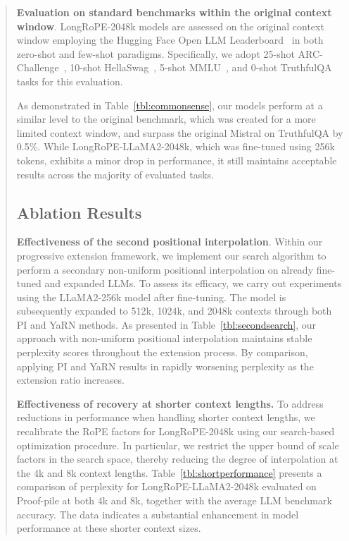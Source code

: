 \begin{abstract}
\textbf{Evaluation on standard benchmarks within the original context window}. LongRoPE-2048k models are assessed on the original context window employing the Hugging Face Open LLM Leaderboard~\cite{huggingfaceboard} in both zero-shot and few-shot paradigms. Specifically, we adopt 25-shot ARC-Challenge~\cite{allenai:arc}, 10-shot HellaSwag~\cite{zellers2019hellaswag}, 5-shot MMLU~\cite{mmlu}, and 0-shot TruthfulQA~\cite{lin2021truthfulqa} tasks for this evaluation.

As demonstrated in Table~\ref{tbl:commonsense}, our models perform at a similar level to the original benchmark, which was created for a more limited context window, and surpass the original Mistral on TruthfulQA by 0.5\%. While LongRoPE-LLaMA2-2048k, which was fine-tuned using 256k tokens, exhibits a minor drop in performance, it still maintains acceptable results across the majority of evaluated tasks.

\subsection{Ablation Results}

\textbf{Effectiveness of the second positional interpolation}. Within our progressive extension framework, we implement our search algorithm to perform a secondary non-uniform positional interpolation on already fine-tuned and expanded LLMs. To assess its efficacy, we carry out experiments using the LLaMA2-256k model after fine-tuning. The model is subsequently expanded to 512k, 1024k, and 2048k contexts through both PI and YaRN methods. As presented in Table~\ref{tbl:secondsearch}, our approach with non-uniform positional interpolation maintains stable perplexity scores throughout the extension process. By comparison, applying PI and YaRN results in rapidly worsening perplexity as the extension ratio increases.

\textbf{Effectiveness of recovery at shorter context lengths.} To address reductions in performance when handling shorter context lengths, we recalibrate the RoPE factors for LongRoPE-2048k using our search-based optimization procedure. In particular, we restrict the upper bound of scale factors in the search space, thereby reducing the degree of interpolation at the 4k and 8k context lengths. Table~\ref{tbl:shortperformance} presents a comparison of perplexity for LongRoPE-LLaMA2-2048k evaluated on Proof-pile at both 4k and 8k, together with the average LLM benchmark accuracy. The data indicates a substantial enhancement in model performance at these shorter context sizes.


\end{abstract}
